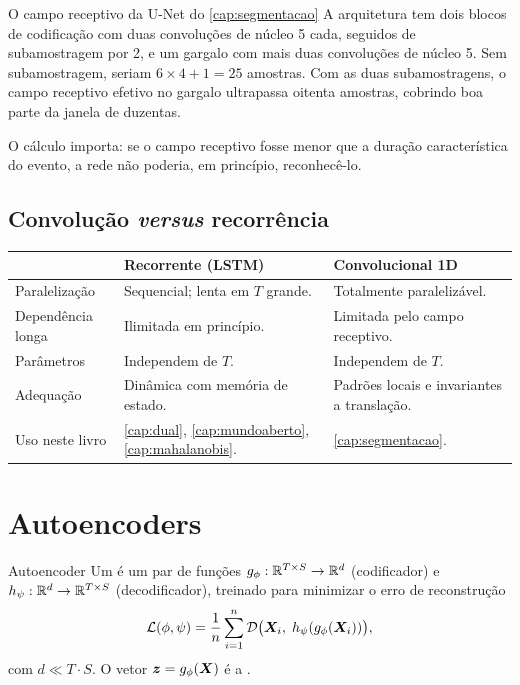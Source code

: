 \begin{exemplo}{O campo receptivo da U-Net do \cref{cap:segmentacao}}
A arquitetura tem dois blocos de codificação com duas convoluções de núcleo 5 cada,
seguidos de subamostragem por 2, e um gargalo com mais duas convoluções de núcleo 5.
Sem subamostragem, seriam $6 \times 4 + 1 = 25$ amostras. Com as duas subamostragens,
o campo receptivo efetivo no gargalo ultrapassa oitenta amostras, cobrindo boa parte da
janela de duzentas.

O cálculo importa: se o campo receptivo fosse menor que a duração característica do
evento, a rede não poderia, em princípio, reconhecê-lo.
\end{exemplo}

\subsection{Convolução \emph{versus} recorrência}

\begin{center}
\small
\begin{tabular}{p{3.2cm} p{4.7cm} p{4.7cm}}
\toprule
& \textbf{Recorrente (LSTM)} & \textbf{Convolucional 1D} \\
\midrule
Paralelização & Sequencial; lenta em $T$ grande. & Totalmente paralelizável. \\
Dependência longa & Ilimitada em princípio. & Limitada pelo campo receptivo. \\
Parâmetros & Independem de $T$. & Independem de $T$. \\
Adequação & Dinâmica com memória de estado. & Padrões locais e invariantes a
translação. \\
Uso neste livro & \cref{cap:dual}, \cref{cap:mundoaberto},
\cref{cap:mahalanobis}. & \cref{cap:segmentacao}. \\
\bottomrule
\end{tabular}
\end{center}

\section{Autoencoders}

\begin{definicao}{Autoencoder}
Um  é um par de funções
$g_{\phi}: \mathbb{R}^{T \times S} \to \mathbb{R}^{d}$ (codificador) e
$h_{\psi}: \mathbb{R}^{d} \to \mathbb{R}^{T \times S}$ (decodificador), treinado para minimizar o erro
de reconstrução
\begin{equation}
  \mathcal{L}(\phi, \psi) = \frac{1}{n}\sum_{i=1}^{n}
  \mathcal{D}\big( \bm{X}_i,\; h_{\psi}(g_{\phi}(\bm{X}_i)) \big),
  \label{eq:ae}
\end{equation}
com $d \ll T \cdot S$. O vetor $\bm{z} = g_{\phi}(\bm{X})$ é a
.
\end{definicao}

